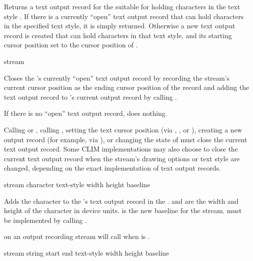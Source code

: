 Returns a text output record for the  
suitable for holding characters in the text style .  If there is
a currently ``open'' text output record that can hold characters in the
specified text style, it is simply returned.  Otherwise a new text output record
is created that can hold characters in that text style, and its starting cursor
position set to the cursor position of .

 {stream}

Closes the  's currently ``open'' text
output record by recording the stream's current cursor position as the ending
cursor position of the record and adding the text output record to
's current output record by calling .

If there is no ``open'' text output record, 
does nothing.

Calling  or , calling
, setting the text cursor position (via
, , or ), creating a
new output record (for example, via ), or changing
the state of  must close the current text output record.
Some CLIM implementations may also choose to close the current text output
record when the stream's drawing options or text style are changed, depending on
the exact implementation of text output records.


 {stream character text-style
                                           width height baseline}

Adds the character  to the 
's text output record in the  .
 and  are the width and height of the character in device
units.   is the new baseline for the stream.
 must be implemented by calling
.

 on an output recording stream will call
 when  is .

 {stream string start end text-style
                                        width height baseline}

